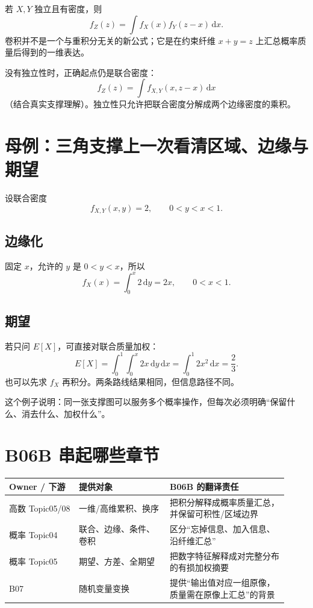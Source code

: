\documentclass[profile=standard]{ipara-handbook}
\begin{document}
若 $X,Y$ 独立且有密度，则
\[
\boxed{f_Z(z)=\int f_X(x)f_Y(z-x)\,\mathrm{d}x.}
\]
卷积并不是一个与重积分无关的新公式；它是在约束纤维 $x+y=z$ 上汇总概率质量后得到的一维表达。

没有独立性时，正确起点仍是联合密度：
\[
f_Z(z)=\int f_{X,Y}(x,z-x)\,\mathrm{d}x
\]
（结合真实支撑理解）。独立性只允许把联合密度分解成两个边缘密度的乘积。

\section{母例：三角支撑上一次看清区域、边缘与期望}
设联合密度
\[
f_{X,Y}(x,y)=2,
\qquad 0<y<x<1.
\]

\subsection{边缘化}
固定 $x$，允许的 $y$ 是 $0<y<x$，所以
\[
f_X(x)=\int_0^x2\,\mathrm{d}y=2x,
\qquad 0<x<1.
\]

\subsection{期望}
若只问 $E[X]$，可直接对联合质量加权：
\[
E[X]=\int_0^1\int_0^x 2x\,\mathrm{d}y\,\mathrm{d}x
=\int_0^1 2x^2\,\mathrm{d}x=\frac23.
\]
也可以先求 $f_X$ 再积分。两条路线结果相同，但信息路径不同。

这个例子说明：同一张支撑图可以服务多个概率操作，但每次必须明确“保留什么、消去什么、加权什么”。

\section{B06B 串起哪些章节}
\begin{tabular}{p{0.23\linewidth}p{0.30\linewidth}p{0.39\linewidth}}
\hline
Owner / 下游 & 提供对象 & B06B 的翻译责任\\
\hline
高数 Topic05/08 & 一维/高维累积、换序 & 把积分解释成概率质量汇总，并保留可积性/区域边界\\
概率 Topic04 & 联合、边缘、条件、卷积 & 区分“忘掉信息、加入信息、沿纤维汇总”\\
概率 Topic05 & 期望、方差、全期望 & 把数字特征解释成对完整分布的有损加权摘要\\
B07 & 随机变量变换 & 提供“输出值对应一组原像，质量需在原像上汇总”的背景\\
\hline
\end{tabular}
\end{document}
